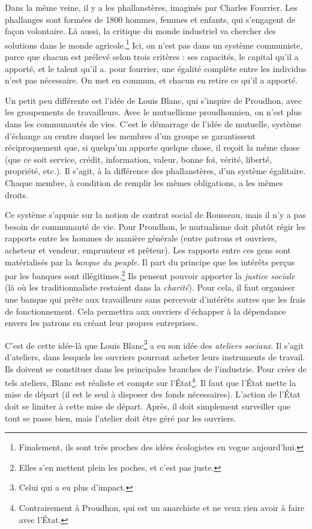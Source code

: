 \documentclass[12pt]{report}
\begin{document}
Dans la même veine, il y a les phallanstères, imaginés par Charles Fourrier. Les phallanges sont formées de 1800 hommes, femmes et enfants, qui s'engagent de façon volontaire.
Là aussi, la critique du monde industriel va chercher des solutions dans le monde agricole.\footnote{Finalement, ils sont très proches des idées écologistes en vogue aujourd'hui.} 
Ici, on n'est pas dans un système communiste, parce que chacun est prélevé selon trois critères : ses capacités, le capital qu'il a apporté, et le talent qu'il a. pour fourrier, une égalité complète entre les individus n'est pas nécessaire. 
On met en commun, et chacun en retire ce qu'il a apporté.


Un petit peu différente est l'idée de Louis Blanc, qui s'inspire de Proudhon, avec les groupements de travailleurs. Avec le mutuellisme proudhonnien, on n'est plus dans les communautés de vies. C'est le démarrage de l'idée de mutuelle, système d'échange au centre duquel les membres d'un groupe se garantissent réciproquement que, si quelqu'un apporte quelque chose, il reçoit la même chose (que ce soit service, crédit, information, valeur, bonne foi, vérité, liberté, propriété, etc.). Il s'agit, à la différence des phallanstères, d'un système égalitaire. Chaque membre, à condition de remplir les mêmes obligations, a les mêmes droits.

Ce système s'appuie sur la notion de contrat social de Rousseau, mais il n'y a pas besoin de communauté de vie. Pour Proudhon, le mutualisme doit plutôt régir les rapports entre les hommes de manière générale (entre patrons et ouvriers, acheteur et vendeur, emprunteur et prêteur). Les rapports entre ces gens sont matérialisés par la \emph{banque du peuple}.
Il part du principe que les intérêts perçus par les banques sont illégitimes.\footnote{Elles s'en mettent plein les poches, et c'est pas juste.} Ils pensent pouvoir apporter la \emph{justice sociale} (là où les traditionnaliste restaient dans la \emph{charité}).
Pour cela, il faut organiser une banque qui prête aux travailleurs sans percevoir d'intérêts autres que les frais de fonctionnement.
Cela permettra aux ouvriers d'échapper à la dépendance envers les patrons en créant leur propres entreprises.


C'est de cette idée-là que Louis Blanc\footnote{Celui qui a eu plus d'impact.} a eu son idée des \emph{ateliers sociaux}.
Il s'agit d'ateliers, dans lesquels les ouvriers pourront acheter leurs instruments de travail. Ils doivent se constituer dans les principales branches de l'industrie.
Pour créer de tels ateliers, Blanc est réaliste et compte sur l'État\footnote{Contrairement à Proudhon, qui est un anarchiste et ne veux rien avoir à faire avec l'État.}. Il faut que l'État mette la mise de départ (il est le seul à disposer des fonds nécessaires). L'action de l'État doit se limiter à cette mise de départ. Après, il doit simplement surveiller que tout se passe bien, mais l'atelier doit être géré par les ouvriers.
\end{document}
